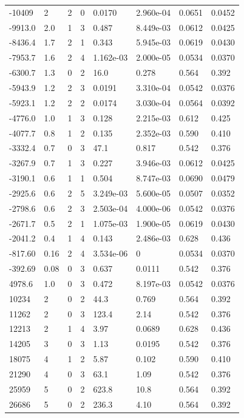 \documentclass[preview]{standalone}
\begin{document}
{{\begin{tabular}{L{1.2cm}C{1.2cm} C{0.3cm}C{0.5cm} C{1.4cm}C{1.4cm} C{1.4cm}C{1.4cm}}
  -10409  &     2  & 2     &  0 &  0.0170  & 2.960e-04  & 0.0651 &  0.0452   \\ 
  -9913.0  &   2.0  & 1     &  3 &  0.487  & 8.449e-03  & 0.0612 &  0.0425   \\ 
  -8436.4  &   1.7  & 2     &  1 &  0.343  & 5.945e-03  & 0.0619 &  0.0430   \\ 
  -7953.7  &   1.6  & 2     &  4 &  1.162e-03  & 2.000e-05  & 0.0534 &  0.0370   \\ 
  -6300.7  &   1.3  & 0     &  2 &  16.0  & 0.278  & 0.564 &  0.392   \\ 
  -5943.9  &   1.2  & 2     &  3 &  0.0191  & 3.310e-04  & 0.0542 &  0.0376   \\ 
  -5923.1  &   1.2  & 2     &  2 &  0.0174  & 3.030e-04  & 0.0564 &  0.0392   \\ 
  -4776.0  &   1.0  & 1     &  3 &  0.128  & 2.215e-03  & 0.612 &  0.425   \\ 
  -4077.7  &   0.8  & 1     &  2 &  0.135  & 2.352e-03  & 0.590 &  0.410   \\ 
  -3332.4  &   0.7  & 0     &  3 &  47.1  & 0.817  & 0.542 &  0.376   \\ 
  -3267.9  &   0.7  & 1     &  3 &  0.227  & 3.946e-03  & 0.0612 &  0.0425   \\ 
  -3190.1  &   0.6  & 1     &  1 &  0.504  & 8.747e-03  & 0.0690 &  0.0479   \\ 
  -2925.6  &   0.6  & 2     &  5 &  3.249e-03  & 5.600e-05  & 0.0507 &  0.0352   \\ 
  -2798.6  &   0.6  & 2     &  3 &  2.503e-04  & 4.000e-06  & 0.0542 &  0.0376   \\ 
  -2671.7  &   0.5  & 2     &  1 &  1.075e-03  & 1.900e-05  & 0.0619 &  0.0430   \\ 
  -2041.2  &   0.4  & 1     &  4 &  0.143  & 2.486e-03  & 0.628 &  0.436   \\ 
  -817.60  &  0.16  & 2     &  4 &  3.534e-06  & 0  & 0.0534 &  0.0370   \\ 
  -392.69  &  0.08  & 0     &  3 &  0.637  & 0.0111  & 0.542 &  0.376   \\ 
  4978.6  &   1.0  & 0     &  3 &  0.472  & 8.197e-03  & 0.0542 &  0.0376   \\ 
  10234  &     2  & 0     &  2 &  44.3  & 0.769  & 0.564 &  0.392   \\ 
  11262  &     2  & 0     &  3 &  123.4  & 2.14  & 0.542 &  0.376   \\ 
  12213  &     2  & 1     &  4 &  3.97  & 0.0689  & 0.628 &  0.436   \\ 
  14205  &     3  & 0     &  3 &  1.13  & 0.0195  & 0.542 &  0.376   \\ 
  18075  &     4  & 1     &  2 &  5.87  & 0.102  & 0.590 &  0.410   \\ 
  21290  &     4  & 0     &  3 &  63.1  & 1.09  & 0.542 &  0.376   \\ 
  25959  &     5  & 0     &  2 &  623.8  & 10.8  & 0.564 &  0.392   \\ 
  26686  &     5  & 0     &  2 &  236.3  & 4.10  & 0.564 &  0.392   \\ 
\hline 
\end{tabular} 

}}
\end{document}
